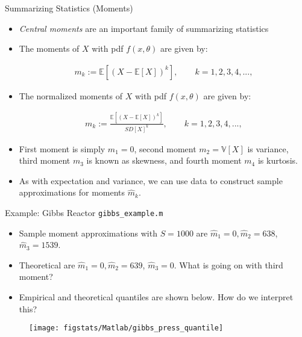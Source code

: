 \documentclass[9pt]{beamer}
\begin{document}
\begin{frame}{Summarizing Statistics (Moments)}

\begin{itemize}
 \setlength{\itemsep}{5pt}
\item {\em Central moments} are an important family of summarizing statistics

\item The moments of $X$ with pdf $f(x,\theta)$ are given by:
\begin{block}{}
\begin{align*}
m_k:=\mathbb{E}[(X-\mathbb{E}[X])^k], \qquad k=1,2,3,4,...,
\end{align*}
\end{block}
\item The normalized moments of $X$ with pdf $f(x,\theta)$ are given by:
\begin{block}{}
\begin{align*}
m_k:=\frac{\mathbb{E}[(X-\mathbb{E}[X])^k]}{SD[X]^k}, \qquad k=1,2,3,4,...,
\end{align*}
\end{block}

\item First moment is simply $m_1=0$, second moment $m_2=\mathbb{V}[X]$ is variance, third moment $m_3$ is known as skewness, and fourth moment  $m_4$ is kurtosis. 

\item As with expectation and variance, we can use data to construct sample approximations for moments $\hat{m}_k$. 

\end{itemize}

\end{frame}

\begin{frame}{Example: Gibbs Reactor \footnotesize{\texttt{gibbs\_example.m}}}
\begin{itemize}
\item Sample moment approximations with $S=1000$ are $\hat{m}_1=0,\hat{m}_2=638$, $\hat{m}_3=1539$.
\item Theoretical are $\hat{m}_1=0,\hat{m}_2=639$, $\hat{m}_3=0$. What is going on with third moment?
\item Empirical and theoretical quantiles are shown below. How do we interpret this? 
\end{itemize}
\begin{figure}[!htb]
    \centering
	\texttt{[image: figstats/Matlab/gibbs\_press\_quantile]}
\end{figure}
\end{frame}
\end{document}
